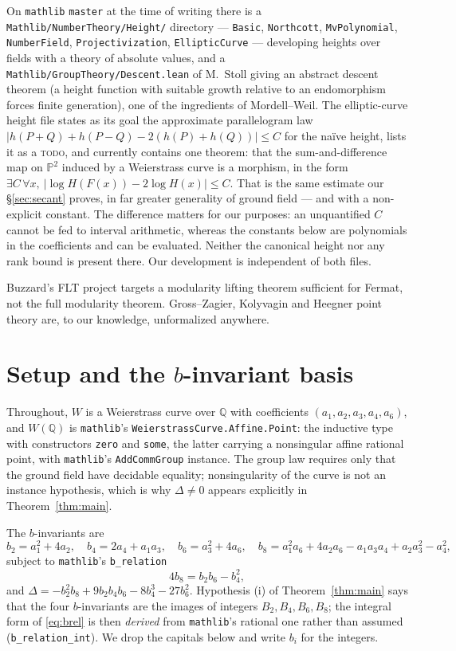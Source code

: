 \documentclass[11pt,reqno]{amsart}
\theoremstyle{plain}
\theoremstyle{definition}
\theoremstyle{remark}
\DeclareRobustCommand{\lt}[1]{\texttt{#1}}
\newcommand{\nh}{H}
\begin{document}
On \texttt{mathlib} \texttt{master} at the time of writing there is a
\lt{Mathlib/NumberTheory/Height/} directory --- \lt{Basic},
\lt{Northcott}, \lt{MvPolynomial}, \lt{NumberField},
\lt{Projectivization}, \lt{EllipticCurve} --- developing heights over
fields with a theory of absolute values, and a
\lt{Mathlib/GroupTheory/Descent.lean} of M.~Stoll giving an abstract
descent theorem (a height function with suitable growth relative to an
endomorphism forces finite generation), one of the ingredients of
Mordell--Weil. The elliptic-curve height file states as its goal the
approximate parallelogram law $\lvert h(P{+}Q) + h(P{-}Q) - 2(h(P) +
h(Q))\rvert \le C$ for the na\"ive height, lists it as a
\textsc{todo}, and currently contains one theorem: that the
sum-and-difference map on $\mathbb{P}^2$ induced by a Weierstrass curve
is a morphism, in the form
$\exists C\, \forall x,\ \lvert \log\nh(F(x)) - 2\log\nh(x)\rvert \le
C$. That is the same estimate our \S\ref{sec:secant} proves, in far
greater generality of ground field --- and with a non-explicit
constant. The difference matters for our purposes: an unquantified $C$
cannot be fed to interval arithmetic, whereas the constants below are
polynomials in the coefficients and can be evaluated. Neither the
canonical height nor any rank bound is present there. Our development
is independent of both files.

Buzzard's FLT project \cite{FLT} targets a modularity lifting theorem
sufficient for Fermat, not the full modularity theorem. Gross--Zagier,
Kolyvagin and Heegner point theory are, to our knowledge, unformalized
anywhere.

\section{Setup and the \texorpdfstring{$b$}{b}-invariant basis}

Throughout, $W$ is a Weierstrass curve over $\mathbb{Q}$ with
coefficients $(a_1,a_2,a_3,a_4,a_6)$, and $W(\mathbb{Q})$ is
\texttt{mathlib}'s \lt{WeierstrassCurve.Affine.Point}: the inductive
type with constructors \lt{zero} and \lt{some}, the latter carrying a
nonsingular affine rational point, with \texttt{mathlib}'s
\lt{AddCommGroup} instance. The group law requires only that the ground
field have decidable equality; nonsingularity of the curve is not an
instance hypothesis, which is why $\Delta \ne 0$ appears explicitly in
Theorem~\ref{thm:main}.

The $b$-invariants are
\[
  b_2 = a_1^2 + 4a_2, \quad b_4 = 2a_4 + a_1a_3, \quad
  b_6 = a_3^2 + 4a_6, \quad
  b_8 = a_1^2a_6 + 4a_2a_6 - a_1a_3a_4 + a_2a_3^2 - a_4^2,
\]
subject to \texttt{mathlib}'s \lt{b\_relation}
\begin{equation}\label{eq:brel}
  4b_8 = b_2b_6 - b_4^2 ,
\end{equation}
and $\Delta = -b_2^2b_8 + 9b_2b_4b_6 - 8b_4^3 - 27b_6^2$. Hypothesis
(i) of Theorem~\ref{thm:main} says that the four $b$-invariants are the
images of integers $B_2,B_4,B_6,B_8$; the integral form of
\eqref{eq:brel} is then \emph{derived} from \texttt{mathlib}'s rational
one rather than assumed
(\lt{b\_relation\_int}). We drop the capitals below and write
$b_i$ for the integers.
\end{document}
